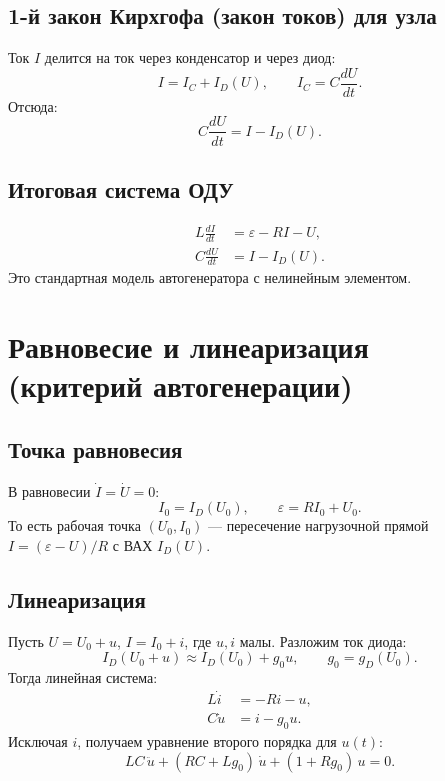 \documentclass[11pt,a4paper]{article}
\begin{document}
\subsection{1-й закон Кирхгофа (закон токов) для узла}
Ток $I$ делится на ток через конденсатор и через диод:
\begin{equation}
I = I_C + I_D(U),\qquad I_C=C\frac{dU}{dt}.
\end{equation}
Отсюда:
\begin{equation}
C\frac{dU}{dt} = I - I_D(U).
\end{equation}

\subsection{Итоговая система ОДУ}
\begin{equation}
\boxed{
\begin{aligned}
L\frac{dI}{dt} &= \varepsilon - RI - U,\\
C\frac{dU}{dt} &= I - I_D(U).
\end{aligned}}
\end{equation}
Это стандартная модель автогенератора с нелинейным элементом.

\section{Равновесие и линеаризация (критерий автогенерации)}
\subsection{Точка равновесия}
В равновесии $\dot I=\dot U=0$:
\begin{equation}
I_0=I_D(U_0),\qquad \varepsilon = RI_0 + U_0.
\end{equation}
То есть рабочая точка $(U_0,I_0)$ --- пересечение нагрузочной прямой $I=(\varepsilon-U)/R$ с ВАХ $I_D(U)$.

\subsection{Линеаризация}
Пусть $U=U_0+u$, $I=I_0+i$, где $u,i$ малы. Разложим ток диода:
\[
I_D(U_0+u)\approx I_D(U_0)+g_0u,\qquad g_0=g_D(U_0).
\]
Тогда линейная система:
\begin{equation}
\begin{aligned}
L\dot i &= -Ri-u,\\
C\dot u &= i-g_0u.
\end{aligned}
\end{equation}
Исключая $i$, получаем уравнение второго порядка для $u(t)$:
\begin{equation}
\boxed{
LC\,\ddot u + (RC+Lg_0)\,\dot u + (1+Rg_0)\,u = 0.}
\end{equation}
\end{document}
